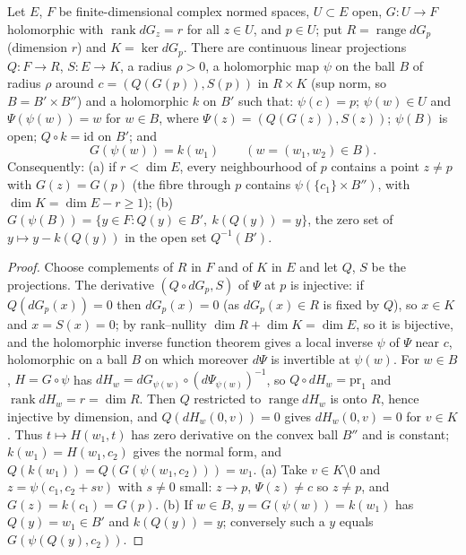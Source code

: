 \begin{lemma}
\label{rem:constant-rank}
\leanok
Let \(E\), \(F\) be finite-dimensional complex normed spaces, \(U\subset E\) open, \(G\colon U\to F\) holomorphic with \(\operatorname{rank}dG_z=r\) for all
\(z\in U\), and \(p\in U\); put \(R=\operatorname{range}dG_p\) (dimension \(r\)) and \(K=\ker dG_p\). There are continuous linear projections \(Q\colon F\to R\),
\(S\colon E\to K\), a radius \(\rho>0\), a holomorphic map \(\psi\) on the ball \(B\) of radius \(\rho\) around \(c=(Q(G(p)),S(p))\) in \(R\times K\) (sup norm, so
\(B=B'\times B''\)) and a holomorphic \(k\) on \(B'\) such that: \(\psi(c)=p\); \(\psi(w)\in U\) and \(\Psi(\psi(w))=w\) for \(w\in B\), where \(\Psi(z)=(Q(G(z)),S(z))\);
\(\psi(B)\) is open; \(Q\circ k=\mathrm{id}\) on \(B'\); and
\[
 G(\psi(w))=k(w_1)\qquad(w=(w_1,w_2)\in B).
\]
Consequently: (a) if \(r<\dim E\), every neighbourhood of \(p\) contains a point \(z\ne p\) with \(G(z)=G(p)\) (the fibre through \(p\) contains
\(\psi(\{c_1\}\times B'')\), with \(\dim K=\dim E-r\ge1\)); (b) \(G(\psi(B))=\{y\in F:Q(y)\in B',\ k(Q(y))=y\}\), the zero set of \(y\mapsto y-k(Q(y))\) in the
open set \(Q^{-1}(B')\).
\end{lemma}
\begin{proof}
\leanok
Choose complements of \(R\) in \(F\) and of \(K\) in \(E\) and let \(Q\), \(S\) be the projections. The derivative \((Q\circ dG_p,S)\) of \(\Psi\) at \(p\) is
injective: if \(Q(dG_p(x))=0\) then \(dG_p(x)=0\) (as \(dG_p(x)\in R\) is fixed by \(Q\)), so \(x\in K\) and \(x=S(x)=0\); by rank--nullity
\(\dim R+\dim K=\dim E\), so it is bijective, and the holomorphic inverse function theorem gives a local inverse \(\psi\) of \(\Psi\) near \(c\), holomorphic
on a ball \(B\) on which moreover \(d\Psi\) is invertible at \(\psi(w)\). For \(w\in B\), \(H=G\circ\psi\) has \(dH_w=dG_{\psi(w)}\circ(d\Psi_{\psi(w)})^{-1}\), so
\(Q\circ dH_w=\mathrm{pr}_1\) and \(\operatorname{rank}dH_w=r=\dim R\). Then \(Q\) restricted to \(\operatorname{range}dH_w\) is onto \(R\), hence injective by
dimension, and \(Q(dH_w(0,v))=0\) gives \(dH_w(0,v)=0\) for \(v\in K\). Thus \(t\mapsto H(w_1,t)\) has zero derivative on the convex ball \(B''\) and is constant;
\(k(w_1)=H(w_1,c_2)\) gives the normal form, and \(Q(k(w_1))=Q(G(\psi(w_1,c_2)))=w_1\). (a) Take \(v\in K\setminus0\) and \(z=\psi(c_1,c_2+sv)\) with \(s\ne0\) small:
\(z\to p\), \(\Psi(z)\ne c\) so \(z\ne p\), and \(G(z)=k(c_1)=G(p)\). (b) If \(w\in B\), \(y=G(\psi(w))=k(w_1)\) has \(Q(y)=w_1\in B'\) and \(k(Q(y))=y\); conversely such a
\(y\) equals \(G(\psi(Q(y),c_2))\).
\end{proof}

